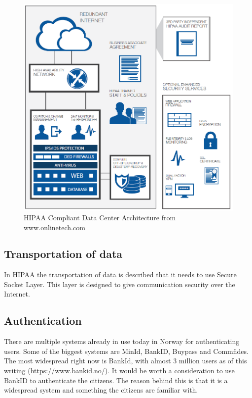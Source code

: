 \begin{figure}[H]
\centering
\includegraphics[scale=0.50]{../Figures/hipaa.png}
\caption{HIPAA Compliant Data Center Architecture from www.onlinetech.com}
\label{figure:HIPAA}
\end{figure}


\subsection{Transportation of data}
In HIPAA the transportation of data is described that it needs to use Secure Socket Layer. 
This layer is designed to give communication security over the Internet. \cite{SSL}


\subsection{Authentication}
There are multiple systems already in use today in Norway for authenticating users. 
Some of the biggest systems are MinId, BankID, Buypass and Commfides.
The most widespread right now is BankId, with almost 3 million users as of this writing (https://www.bankid.no/).
It would be worth a consideration to use BankID to authenticate the citizens. 
The reason behind this is that it is a widespread system and something the citizens are familiar with. 

